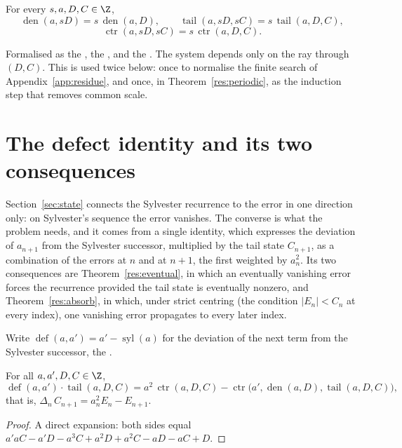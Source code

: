 \documentclass[11pt]{article}
\newcommand{\sylnext}{\operatorname{syl}}
\newcommand{\den}{\operatorname{den}}
\newcommand{\tail}{\operatorname{tail}}
\newcommand{\ctr}{\operatorname{ctr}}
\newcommand{\defect}{\operatorname{def}}
\begin{document}
\begin{proposition}\label{res:scale}
For every $s,a,D,C\in\Z$,
\[
 \den(a,sD)=s\,\den(a,D),\qquad
 \tail(a,sD,sC)=s\,\tail(a,D,C),
\]
\[
 \ctr(a,sD,sC)=s\,\ctr(a,D,C).
\]
\end{proposition}

\noindent Formalised as the
, the
, and the
.  The system depends only on the ray through $(D,C)$.  This is
used twice below: once to normalise the finite search of
Appendix~\ref{app:residue}, and once, in Theorem~\ref{res:periodic}, as the
induction step that removes common scale.

\section{The defect identity and its two consequences}\label{sec:defect}

Section~\ref{sec:state} connects the Sylvester recurrence to the error in one
direction only: on Sylvester's sequence the error vanishes.  The converse is
what the problem needs, and it comes from a single identity, which expresses
the deviation of $a_{n+1}$
from the Sylvester successor, multiplied by the tail state $C_{n+1}$, as a
combination of the errors at $n$ and at $n+1$, the first weighted by
$a_n^{2}$.  Its two consequences are
Theorem~\ref{res:eventual}, in which an eventually vanishing error forces the
recurrence provided the tail state is eventually nonzero, and
Theorem~\ref{res:absorb}, in which, under strict centring (the condition
$|E_n|<C_n$ at every index), one vanishing error propagates to every later
index.

Write $\defect(a,a')=a'-\sylnext(a)$ for the deviation of the next term from
the Sylvester successor, the
.

\begin{theorem}\label{res:defect}
For all $a,a',D,C\in\Z$,
\[
 \defect(a,a')\cdot\tail(a,D,C)
 =a^{2}\,\ctr(a,D,C)-\ctr\bigl(a',\den(a,D),\tail(a,D,C)\bigr),
\]
that is, $\Delta_n\,C_{n+1}=a_n^{2}E_n-E_{n+1}$.
\end{theorem}

\begin{proof}
A direct expansion: both sides equal
$a'aC-a'D-a^{3}C+a^{2}D+a^{2}C-aD-aC+D$.
\end{proof}
\end{document}
